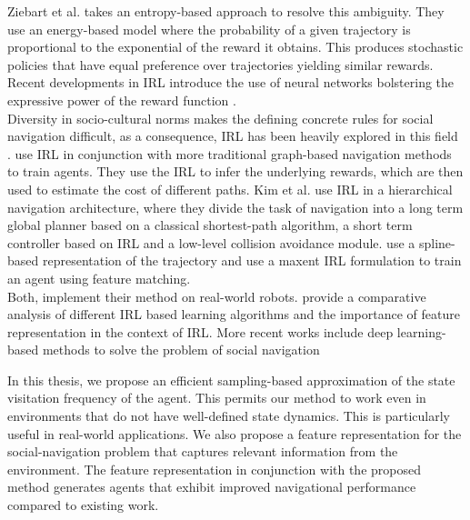 Ziebart et al. \cite{ziebart_maxent_2008} takes an entropy-based approach to resolve this ambiguity. They use an energy-based model where the probability of a given trajectory is proportional to the exponential of the reward it obtains.
This produces stochastic policies that have equal preference over trajectories yielding similar rewards. Recent developments in IRL introduce the use of neural networks bolstering the expressive power of the reward function \cite{wulfmeier2015maximum}. \\

Diversity in socio-cultural norms makes the defining concrete rules for social navigation difficult, as a consequence, IRL has been heavily explored in this field \cite{kuderer_socially_nodate, kretzschmar_socially_2016}. \cite{shiarlis_rapidly_2017, okal_efcient_nodate} use IRL in conjunction with more traditional graph-based navigation methods to train agents. They use the IRL to infer the underlying rewards, which are then used to estimate the cost of different paths. Kim et al. \cite{kim_socially_2016} use IRL in a hierarchical navigation architecture, where they divide the task of navigation into a long term global planner based on a classical shortest-path algorithm, a short term controller based on IRL and a low-level collision avoidance module. \cite{kretzschmar_socially_2016} use a spline-based representation of the trajectory and use a maxent IRL formulation to train an agent using feature matching. 
\\
Both,\cite{kim_socially_2016, kretzschmar_socially_2016} implement their method on real-world robots. \cite{vasquez_inverse_2014} provide a comparative analysis of different IRL based learning algorithms and the importance of feature representation in the context of IRL. More recent works include deep learning-based methods to solve the problem of social navigation \cite{fahad_learning_2018, wulfmeier2015maximum}


In this thesis, we propose an efficient sampling-based approximation of the state visitation frequency of the agent. This permits our method to work even in environments that do not have well-defined state dynamics. This is particularly useful in real-world applications. We also propose a feature representation for the social-navigation problem that captures relevant information from the environment. The feature representation in conjunction with the proposed method generates agents that exhibit improved navigational performance compared to existing work.

